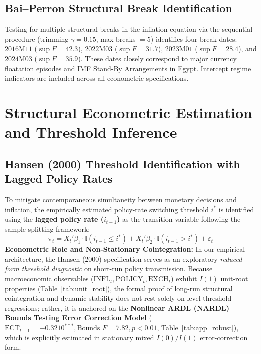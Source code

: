 \documentclass[review,12pt]{elsarticle}
\begin{document}
\subsection{Bai--Perron Structural Break Identification}
\label{sec:breaks}

Testing for multiple structural breaks in the inflation equation via the sequential
\citet{baiperron1998, baiperron2003} procedure (trimming $\gamma = 0.15$, max breaks $= 5$)
identifies four break dates: $2016\text{M}11$ ($\sup F = 42.3$), $2022\text{M}03$ ($\sup F = 31.7$),
$2023\text{M}01$ ($\sup F = 28.4$), and $2024\text{M}03$ ($\sup F = 35.9$). These dates closely
correspond to major currency floatation episodes and IMF Stand-By Arrangements in Egypt.
Intercept regime indicators are included across all econometric specifications.

\section{Structural Econometric Estimation and Threshold Inference}
\label{sec:empirical}

\subsection{Hansen (2000) Threshold Identification with Lagged Policy Rates}
\label{sec:threshold_id}

To mitigate contemporaneous simultaneity between monetary decisions and inflation, the empirically estimated policy-rate switching threshold $i^*$ is identified using the \textbf{lagged policy rate ($i_{t-1}$)} as the transition variable following the \citet{hansen2000} sample-splitting framework:
\begin{equation}
\pi_t = X_t'\beta_1 \cdot \mathbb{I}(i_{t-1} \le i^*) + X_t'\beta_2 \cdot \mathbb{I}(i_{t-1} > i^*) + \varepsilon_t
\label{eq:hansen_model}
\end{equation}
\textbf{Econometric Role and Non-Stationary Cointegration:} In our empirical architecture, the Hansen (2000) specification serves as an exploratory \textit{reduced-form threshold diagnostic} on short-run policy transmission. Because macroeconomic observables ($\text{INFL}_t, \text{POLICY}_t, \text{EXCH}_t$) exhibit $I(1)$ unit-root properties (Table~\ref{tab:unit_root}), the formal proof of long-run structural cointegration and dynamic stability does not rest solely on level threshold regressions; rather, it is anchored on the \textbf{Nonlinear ARDL (NARDL) Bounds Testing Error Correction Model} ($\text{ECT}_{t-1} = -0.3210^{***}, \text{Bounds } F = 7.82, p < 0.01$, Table~\ref{tab:app_robust}), which is explicitly estimated in stationary mixed $I(0)/I(1)$ error-correction form.
\end{document}
